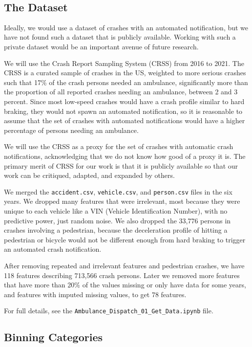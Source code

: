 \


\subsection{The Dataset}

Ideally, we would use a dataset of crashes with an automated notification, but we have not found such a dataset that is publicly available.  Working with such a private dataset would be an important avenue of future research.

We will use the Crash Report Sampling System (CRSS) from 2016 to 2021.  The CRSS is a curated sample of crashes in the US, weighted to more serious crashes such that 17\% of the crash persons needed an ambulance, significantly more than the proportion of all reported crashes needing an ambulance, between 2 and 3 percent.  Since most low-speed crashes would have a crash profile similar to hard braking, they would not spawn an automated notification, so it is reasonable to assume that the set of crashes with automated notifications would have a higher percentage of persons needing an ambulance.  

We will use the CRSS as a proxy for the set of crashes with automatic crash notifications, acknowledging that we do not know how good of a proxy it is.  The primary merit of CRSS for our work is that it is publicly available so that our work can be critiqued, adapted, and expanded by others.  

We merged the \verb|accident.csv|, \verb|vehicle.csv|, and \verb|person.csv| files in the six years.  We dropped many features that were irrelevant, most because they were unique to each vehicle like a VIN (Vehicle Identification Number), with no predictive power, just random noise.  We also dropped the 33,776 persons in crashes involving a pedestrian, because the deceleration profile of hitting a pedestrian or bicycle would not be different enough from hard braking to trigger an automated crash notification.  

After removing repeated and irrelevant features and pedestrian crashes, we have 118 features describing 713,566 crash persons.  Later we removed more features that have more than 20\% of the values missing or only have data for some years, and features with imputed missing values, to get 78 features.

For full details, see the \verb|Ambulance_Dispatch_01_Get_Data.ipynb| file.  

\subsection{Binning Categories}


